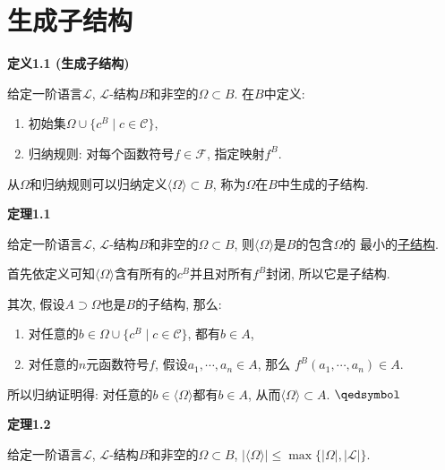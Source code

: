 \documentclass[UTF8]{ctexart}
\begin{document}
\setlength{\abovedisplayskip}{1pt}
\setlength{\belowdisplayskip}{1pt}

\section{生成子结构}

\hypertarget{sec:定义1.1}{}
\noindent\textbf{定义1.1 (生成子结构)}

给定一阶语言$\mathcal{L}$, $\mathcal{L}$-结构$B$和非空的$\Omega\subset B$.
在$B$中定义:
\begin{enumerate}
    \item 初始集$\Omega\cup\{c^B\mid c\in\mathcal{C}\}$,
    \item 归纳规则: 对每个函数符号$f\in\mathcal{F}$, 指定映射$f^B$.
\end{enumerate}
从$\Omega$和归纳规则可以归纳定义$\langle\Omega\rangle\subset B$,
称为$\Omega$在$B$中生成的子结构.

\vspace{10pt}

\hypertarget{sec:定理1.1}{}
\noindent\textbf{定理1.1}

给定一阶语言$\mathcal{L}$, $\mathcal{L}$-结构$B$和非空的$\Omega\subset B$,
则$\langle\Omega\rangle$是$B$的包含$\Omega$的
最小的\href{03 子结构#nameddest=sec:定义1.1}{子结构}.


首先依定义可知$\langle\Omega\rangle$含有所有的$c^B$并且对所有$f^B$封闭, 所以它是子结构.

其次, 假设$A\supset\Omega$也是$B$的子结构, 那么:
\begin{enumerate}
    \item 对任意的$b\in\Omega\cup\{c^B\mid c\in\mathcal{C}\}$, 都有$b\in A$,
    \item 对任意的$n$元函数符号$f$, 假设$a_1,\cdots,a_n\in A$, 那么
    $f^B(a_1,\cdots,a_n)\in A$.
\end{enumerate}

所以归纳证明得: 对任意的$b\in\langle\Omega\rangle$都有$b\in A$,
从而$\langle\Omega\rangle\subset A$. \hfill $\qedsymbol$

\vspace{10pt}

\hypertarget{sec:定理1.2}{}
\noindent\textbf{定理1.2}

给定一阶语言$\mathcal{L}$, $\mathcal{L}$-结构$B$和非空的$\Omega\subset B$,
$|\langle\Omega\rangle|\leqslant\max\{|\Omega|,|\mathcal{L}|\}$.

\end{document}

